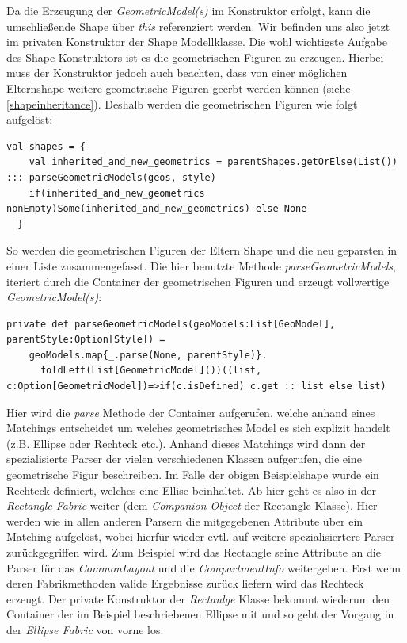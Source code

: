 Da die Erzeugung der \textit{GeometricModel(s)} im Konstruktor erfolgt, kann die umschließende Shape über \textit{this} referenziert werden. Wir befinden uns also jetzt im privaten Konstruktor der Shape Modellklasse. Die wohl wichtigste Aufgabe des Shape Konstruktors ist es die geometrischen Figuren zu erzeugen. Hierbei muss der Konstruktor jedoch auch beachten, dass von einer möglichen Elternshape weitere geometrische Figuren geerbt werden können (siehe \ref{shapeinheritance}). Deshalb werden die geometrischen Figuren wie folgt aufgelöst:
\begin{lstlisting}[style = scala]
val shapes = {
    val inherited_and_new_geometrics = parentShapes.getOrElse(List()) ::: parseGeometricModels(geos, style)
    if(inherited_and_new_geometrics nonEmpty)Some(inherited_and_new_geometrics) else None
  }
\end{lstlisting}So werden die geometrischen Figuren der Eltern Shape und die neu geparsten in einer Liste zusammengefasst. Die hier benutzte Methode \textit{parseGeometricModels}, iteriert durch die Container der geometrischen Figuren und erzeugt vollwertige \textit{GeometricModel(s)}:
\begin{lstlisting}[style = scala]
private def parseGeometricModels(geoModels:List[GeoModel], parentStyle:Option[Style]) =
    geoModels.map{_.parse(None, parentStyle)}.
      foldLeft(List[GeometricModel]())((list, c:Option[GeometricModel])=>if(c.isDefined) c.get :: list else list)
\end{lstlisting}Hier wird die \textit{parse} Methode der Container aufgerufen, welche anhand eines Matchings entscheidet um welches geometrisches Model es sich explizit handelt (z.B. Ellipse oder Rechteck etc.). Anhand dieses Matchings wird dann der spezialisierte Parser der vielen verschiedenen Klassen aufgerufen, die eine geometrische Figur beschreiben. Im Falle der obigen Beispielshape wurde ein Rechteck definiert, welches eine Ellise beinhaltet. Ab hier geht es also in der \textit{Rectangle Fabric} weiter (dem \textit{Companion Object} der Rectangle Klasse). Hier werden wie in allen anderen Parsern die mitgegebenen Attribute über ein Matching aufgelöst, wobei hierfür wieder evtl. auf weitere spezialisiertere Parser zurückgegriffen wird. Zum Beispiel wird das Rectangle seine Attribute an die Parser für das \textit{CommonLayout} und die \textit{CompartmentInfo} weitergeben. Erst wenn deren Fabrikmethoden valide Ergebnisse zurück liefern wird das Rechteck erzeugt. Der private Konstruktor der \textit{Rectanlge} Klasse bekommt wiederum den Container der im Beispiel beschriebenen Ellipse mit und so geht der Vorgang in der \textit{Ellipse Fabric} von vorne los. 
